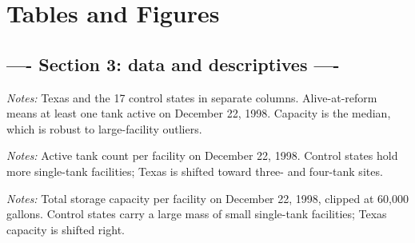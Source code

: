 \documentclass[
  12pt,
]{article}
\begin{document}
\section*{Tables and Figures}\label{tables-and-figures}

\subsection{---- Section 3: data and descriptives
----}\label{section-3-data-and-descriptives--}

\clearpage
\null\vfill
\begin{center}
\label{tbl-summary}
\vspace{6pt}

\par\vspace{10pt}
\begin{minipage}{0.85\textwidth}\small\textit{Notes:} Texas and the 17 control states in separate columns. Alive-at-reform means at least one tank active on December 22, 1998. Capacity is the median, which is robust to large-facility outliers.\end{minipage}
\end{center}
\vfill\clearpage

\clearpage
\null\vfill
\begin{center}
\label{fig-baseline-tanks}
\par\vspace{8pt}
\par\vspace{8pt}
\begin{minipage}{0.85\textwidth}\small\textit{Notes:} Active tank count per facility on December 22, 1998. Control states hold more single-tank facilities; Texas is shifted toward three- and four-tank sites.\end{minipage}
\end{center}
\vfill\clearpage

\clearpage
\null\vfill
\begin{center}
\label{fig-baseline-capacity}
\par\vspace{8pt}
\par\vspace{8pt}
\begin{minipage}{0.85\textwidth}\small\textit{Notes:} Total storage capacity per facility on December 22, 1998, clipped at 60,000 gallons. Control states carry a large mass of small single-tank facilities; Texas capacity is shifted right.\end{minipage}
\end{center}
\vfill\clearpage
\end{document}
